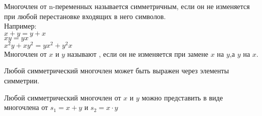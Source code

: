 \begin{defin}
	Многочлен от n-переменных называется симметричным, если он не изменяется при
          любой перестановке входящих в него символов.\\

          Например:\\
          $x + y = y + x$\\
          $xy = yx$\\
          $x^2y + xy^2 = yx^2 + y^2x$\\

         Многочлен от $x$ и $y$ называют , если он не изменяется
         при замене $x$ на $y$,а $y$ на $x$.
\end{defin}

\begin{theorem}
	Любой симметрический многочлен может быть выражен через элементы симметрии.

           Любой симметрический многочлен от $x$ и $y$ можно представить в виде 
           многочлена от $s_1 = x + y$ и $s_2 = x \cdot y$
\end{theorem}

